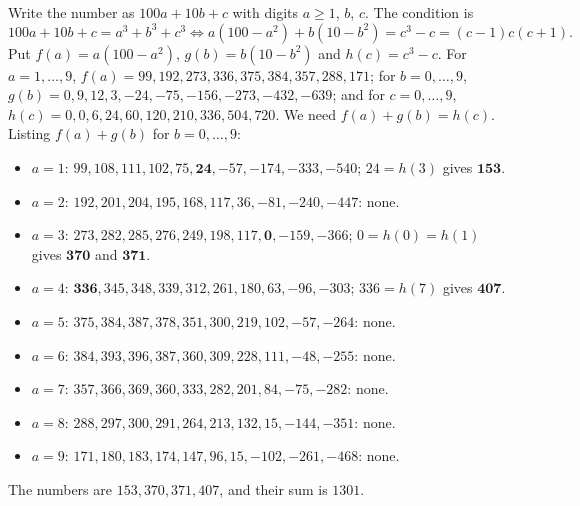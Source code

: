 Write the number as $100a+10b+c$ with digits $a\ge1$, $b$, $c$. The condition is
\[
100a+10b+c=a^3+b^3+c^3\iff a(100-a^2)+b(10-b^2)=c^3-c=(c-1)c(c+1).
\]
Put $f(a)=a(100-a^2)$, $g(b)=b(10-b^2)$ and $h(c)=c^3-c$. For $a=1,\dots,9$, $f(a)=99,192,273,336,375,384,357,288,171$; for $b=0,\dots,9$, $g(b)=0,9,12,3,-24,-75,-156,-273,-432,-639$; and for $c=0,\dots,9$, $h(c)=0,0,6,24,60,120,210,336,504,720$. We need $f(a)+g(b)=h(c)$. Listing $f(a)+g(b)$ for $b=0,\dots,9$:
\begin{itemize}
\item $a=1$: $99,108,111,102,75,\mathbf{24},-57,-174,-333,-540$; $24=h(3)$ gives $\mathbf{153}$.
\item $a=2$: $192,201,204,195,168,117,36,-81,-240,-447$: none.
\item $a=3$: $273,282,285,276,249,198,117,\mathbf{0},-159,-366$; $0=h(0)=h(1)$ gives $\mathbf{370}$ and $\mathbf{371}$.
\item $a=4$: $\mathbf{336},345,348,339,312,261,180,63,-96,-303$; $336=h(7)$ gives $\mathbf{407}$.
\item $a=5$: $375,384,387,378,351,300,219,102,-57,-264$: none.
\item $a=6$: $384,393,396,387,360,309,228,111,-48,-255$: none.
\item $a=7$: $357,366,369,360,333,282,201,84,-75,-282$: none.
\item $a=8$: $288,297,300,291,264,213,132,15,-144,-351$: none.
\item $a=9$: $171,180,183,174,147,96,15,-102,-261,-468$: none.
\end{itemize}
The numbers are $153,370,371,407$, and their sum is $\boxed{1301}$.
